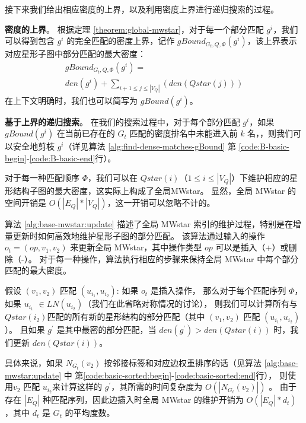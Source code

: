 接下来我们给出相应密度的上界，以及利用密度上界进行递归搜索的过程。



\textbf{密度的上界}。 根据定理 \ref{theorem:global-mwstar}，对于每一个部分匹配 $g^i$，我们可以得到包含 $g^i$ 的完全匹配的密度上界，记作 $gBound_{G_t, Q, \Phi}(g^i)$，该上界表示对应星形子图中部分匹配的最大密度：
  \begin{equation*}
	\begin{multlined}
	 gBound_{G_t, Q, \Phi}(g^i) =  \\ den(g^i) + \sum\nolimits_{i+1\leq j\leq |V_Q|} \left(den(Qstar(j))\right)
	\end{multlined}
  \end{equation*}
  在上下文明确时，我们也可以简写为 $gBound(g^i)$。
  
  \textbf{基于上界的递归搜索}。 在我们的搜索过程中，对于每个部分匹配 $g^i$，如果 $gBound(g^i)$ 在当前已存在的 $G_t$ 匹配的密度排名中未能进入前 $k$ 名，，则我们可以安全地剪枝 $g^i$（详见算法 \ref{alg:find-dense-matches-gBound}  第 \ref{code:B-basic-begin}-\ref{code:B-basic-end}行）。
  
  对于每一种匹配顺序 $\Phi$，我们可以在 $Qstar(i)$（$1 \leq i \leq |V_Q|$）下维护相应的星形结构子图的最大密度，这实际上构成了全局MWstar。
  显然，全局 MWstar 的空间开销是 $O(|E_Q|*|V_Q|)$，这一开销可以忽略不计的。

    算法 \ref{alg:base-mwstar:update} 描述了全局 MWstar 索引的维护过程，特别是在增量更新时如何高效地维护星形子图的部分匹配。
    该算法通过输入的操作 $o_t = (op, v_1, v_2)$ 来更新全局 MWstar，其中操作类型 $op$ 可以是插入（+）或删除（-）。
    对于每一种操作，算法执行相应的步骤来保持全局 MWstar 中每个部分匹配的最大密度。
    
    假设 $(v_1, v_2)$ 匹配 $(u_{i_1}, u_{i_2})$: 
     如果 $o_t$ 是插入操作，
     那么对于每个匹配序列 $\Phi$，如果 $u_{i_1}$ $\in LN(u_{i_2})$（我们在此省略对称情况的讨论），
     则我们可以计算所有与 $Qstar(i_2)$匹配的所有新的星形结构的部分匹配（其中 $(v_1, v_2)$ 匹配 $(u_{i_1}, u_{i_2})$）。
     且如果 $g^\prime$ 是其中最密的部分匹配，当 $den(g^\prime) > den(Qstar(i))$ 时，我们更新 $den(Qstar(i))$。
     
     具体来说，如果 $N_{G_t}(v_2)$ 按邻接标签和对应边权重排序的话（见算法 \ref{alg:base-mwstar:update} 中 第\ref{code:basic-sorted:begin}-\ref{code:basic-sorted:end}行），
     则使用$v_2$ 匹配 $u_{i_2}$来计算这样的 $g^\prime$，其所需的时间复杂度为 $O(|N_{G_t}(v_2)|)$ 。
     由于存在 $|E_Q|$ 种匹配序列，因此边插入时全局 MWstar 的维护开销为 $O(|E_Q|*d_t)$，其中 $d_t$ 是 $G_t$ 的平均度数。
     
